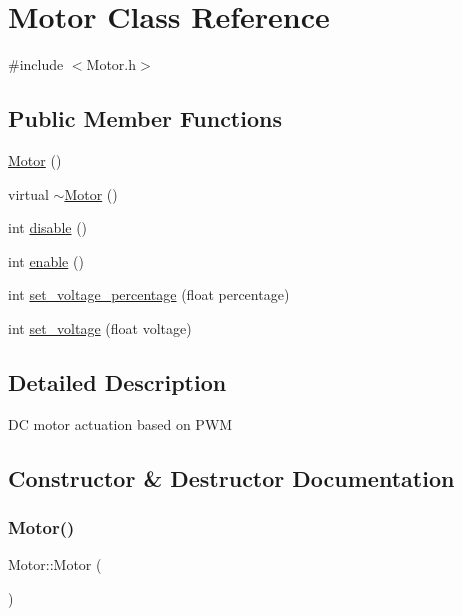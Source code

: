 \hypertarget{classMotor}{}\section{Motor Class Reference}
\label{classMotor}


{\ttfamily \#include $<$Motor.\+h$>$}

\subsection*{Public Member Functions}
\begin{DoxyCompactItemize}
\item 
\mbox{\hyperlink{classMotor_af6106b4c506411265c5face762b6c004}{Motor}} ()
\item 
virtual \mbox{\hyperlink{classMotor_a2e57c7b2681efea1d3b7f253ee88ecd4}{$\sim$\+Motor}} ()
\item 
int \mbox{\hyperlink{classMotor_ac019bca262791cea21e1c84c9156d199}{disable}} ()
\item 
int \mbox{\hyperlink{classMotor_aff58309122a4ba7ea4d037e288c9192f}{enable}} ()
\item 
int \mbox{\hyperlink{classMotor_a7fda59cead716e5cd5ce252741d3d47b}{set\+\_\+voltage\+\_\+percentage}} (float percentage)
\item 
int \mbox{\hyperlink{classMotor_a59b7b398bb2c52654a0b998643b3fbb8}{set\+\_\+voltage}} (float voltage)
\end{DoxyCompactItemize}


\subsection{Detailed Description}
DC motor actuation based on P\+WM 

\subsection{Constructor \& Destructor Documentation}
\mbox{\label{classMotor_af6106b4c506411265c5face762b6c004}} 
\subsubsection{\texorpdfstring{Motor()}{Motor()}}
{\footnotesize\ttfamily Motor\+::\+Motor (\begin{DoxyParamCaption}{ }\end{DoxyParamCaption})}

